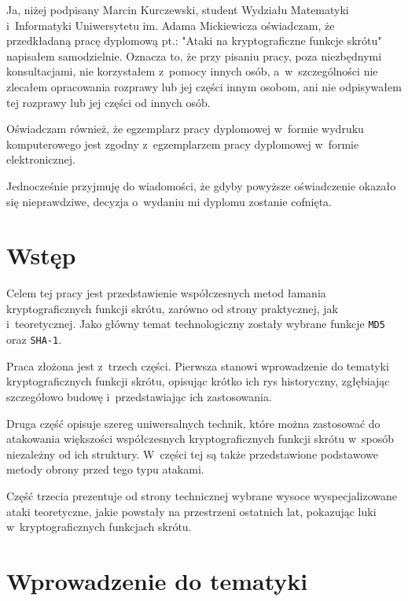 \documentclass[12pt,a4paper,twoside]{article}
\begin{document}
Ja, niżej podpisany Marcin Kurczewski, student Wydziału Matematyki
i~Informatyki Uniwersytetu im. Adama Mickiewicza oświadczam, że przedkładaną
pracę dyplomową pt.: "Ataki na kryptograficzne funkcje skrótu" napisałem
samodzielnie. Oznacza to, że przy pisaniu pracy, poza niezbędnymi
konsultacjami, nie korzystałem z~pomocy innych osób, a~w~szczególności nie
zlecałem opracowania rozprawy lub jej części innym osobom, ani nie odpisywałem
tej rozprawy lub jej części od innych osób.

Oświadczam również, że egzemplarz pracy dyplomowej w~formie wydruku
komputerowego jest zgodny z~egzemplarzem pracy dyplomowej w~formie
elektronicznej.

Jednocześnie przyjmuję do wiadomości, że gdyby powyższe oświadczenie okazało
się nieprawdziwe, decyzja o~wydaniu mi dyplomu zostanie cofnięta.


\newpage
\setcounter{tocdepth}{3}
\tableofcontents

\newpage
\pagestyle{fancy}


\section{Wstęp}
Celem tej pracy jest przedstawienie współczesnych metod łamania
kryptograficznych funkcji skrótu, zarówno od strony praktycznej, jak
i~teoretycznej. Jako główny temat technologiczny zostały wybrane funkcje
\texttt{MD5} oraz \texttt{SHA-1}.

Praca złożona jest z~trzech części. Pierwsza stanowi wprowadzenie do tematyki
kryptograficznych funkcji skrótu, opisując krótko ich rys historyczny,
zgłębiając szczegółowo budowę i~przedstawiając ich zastosowania.

Druga część opisuje szereg uniwersalnych technik, które można zastosować do
atakowania większości współczesnych kryptograficznych funkcji skrótu w~sposób
niezależny od ich struktury. W~części tej są także przedstawione podstawowe
metody obrony przed tego typu atakami.

Część trzecia prezentuje od strony technicznej wybrane wysoce wyspecjalizowane
ataki teoretyczne, jakie powstały na przestrzeni ostatnich lat, pokazując luki
w~kryptograficznych funkcjach skrótu.

\newpage



\section{Wprowadzenie do tematyki}
\end{document}
